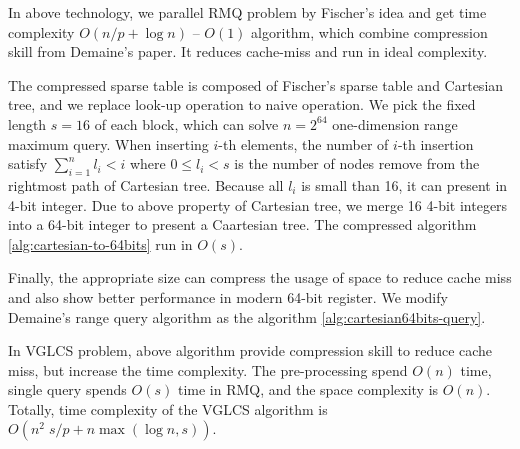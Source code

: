In above technology, we parallel RMQ problem by Fischer's idea and get
time complexity $O(n / p + \log n)$ -- $O(1)$ algorithm, which combine
compression skill from Demaine's paper. It reduces cache-miss and run in
ideal complexity.

\iffalse
在上述的技術中，我們可以藉由 Fischer 提出的方案平行化 RMQ 至 $O(n / p + \log n)$ -- $O(1)$，使用 Demaine 提供的技巧壓縮空間使用量，降低快取未中以提升運行效能。這裡我們挑選固定長度的壓縮方案 $s = 16$，其能解決序列長度為 $n = 2^{64}$ 的區間查找，將 16 個整數壓縮成一棵笛卡爾樹。在第 $i$ 次插入時，左旋的次數 $l_i$，每次操作皆符合 $\sum_{i=1}^{n} l_i < i$。
\fi

The compressed sparse table is composed of Fischer's sparse table and
Cartesian tree, and we replace look-up operation to naive operation.  We
pick the fixed length $s = 16$ of each block, which can solve $n =
2^{64}$ one-dimension range maximum query.  When inserting $i$-th
elements, the number of $i$-th insertion satisfy $\sum_{i=1}^{n} l_i <
i$ where $0 \le l_i < s$ is the number of nodes remove from the
rightmost path of Cartesian tree.  Because all $l_i$ is small than 16,
it can present in 4-bit integer.  Due to above property of Cartesian
tree, we merge 16 4-bit integers into a 64-bit integer to present a
Caartesian tree. The compressed algorithm \ref{alg:cartesian-to-64bits}
run in $O(s)$.




Finally, the appropriate size can compress the usage of space to
reduce cache miss and also show better performance in modern 64-bit
register.  We modify Demaine's range query algorithm as the algorithm
\ref{alg:cartesian64bits-query}.



\iffalse
因所有 $l_i < 16$，使得每個 $l_i$ 可用 4-bit 表示之，
整體便可用 64-bit 長整數表示一棵笛卡爾樹的狀態。
為了現在常見的 64-byte 快取列 (cache line) 和 64-bit 暫存器 (register) 考量，
我們選用合適的大小進行測試，不僅壓縮空間使用量，同時也減少快取未中的問題。
最後，我們得到壓縮算法 \ref{alg:cartesian-to-64bits}，其相對應的區間查找算法，
根據 Demaine \cite{demaine} 進行修改，得到壓縮下的詢問算法 \ref{alg:cartesian64bits-query}。
\fi

In VGLCS problem, above algorithm provide compression skill to reduce
cache miss, but increase the time complexity.  The pre-processing spend
$O(n)$ time, single query spends $O(s)$ time in RMQ, and the space
complexity is  $O(n)$.  Totally, time complexity of the VGLCS algorithm
is $O(n^2 \; s / p + n \max(\log n, s))$.

\iffalse
回到 VGLCS 的應用中，上述算法使用壓縮方式降低快取未中。
我們可以使用上述的算法取代原先的并查集，建表的時間複雜度為 $O(n)$，
單一查詢的時間複雜度為 $O(s)$。
整體的時間複雜度為 $O(n^2 \; s / p + n \max(\log n, s))$。
\fi